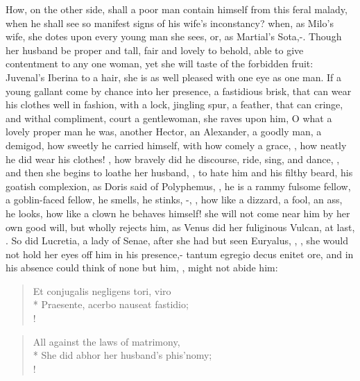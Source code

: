 How, on the other side, shall a poor man contain himself from this
feral malady, when he shall see so manifest signs of his wife's
inconstancy? when, as Milo's wife, she dotes upon every young man she
sees, or, as Martial's Sota,-. Though her husband be proper
and tall, fair and lovely to behold, able to give contentment to any
one woman, yet she will taste of the forbidden fruit: Juvenal's Iberina
to a hair, she is as well pleased with one eye as one man. If a young
gallant come by chance into her presence, a fastidious brisk, that can
wear his clothes well in fashion, with a lock, jingling spur, a
feather, that can cringe, and withal compliment, court a gentlewoman,
she raves upon him, O what a lovely proper man he was, another Hector,
an Alexander, a goodly man, a demigod, how sweetly he carried himself,
with how comely a grace, ,
how neatly he did wear his clothes! , how bravely did he discourse, ride, sing, and
dance, \etc{}, and then she begins to loathe her husband, , to hate him and his filthy beard, his goatish complexion, as
Doris said of Polyphemus, ,
he is a rammy fulsome fellow, a goblin-faced fellow, he smells, he
stinks, -,
\etc{}, how like a dizzard, a fool, an ass, he looks, how like a clown he
behaves himself! she will not come near him by her own good will,
but wholly rejects him, as Venus did her fuliginous Vulcan, at last,
. So did Lucretia,
a lady of Senae, after she had but seen Euryalus, , \etc{}, she would not hold her eyes off him in
his presence,- tantum egregio decus enitet ore, and in his
absence could think of none but him, ,
might not abide him:
%
\begin{latin}
\begin{verse}%
Et conjugalis negligens tori, viro\\*
Praesente, acerbo nauseat fastidio;\\!
\end{verse}%
\end{latin}
\translationrule%
\begin{verse}%
All against the laws of matrimony,\\*
She did abhor her husband's phis'nomy;\\!
\end{verse}%


